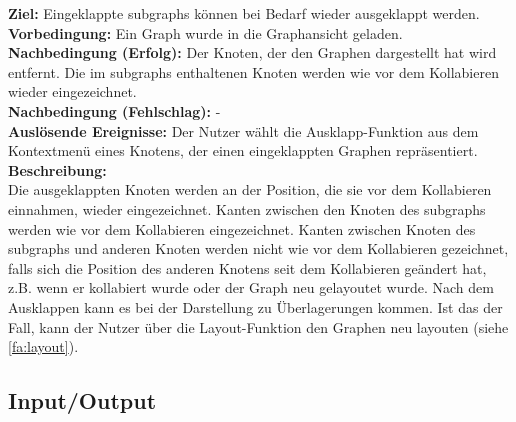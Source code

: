 \label{fa:ausklappen}
\textbf{Ziel:} Eingeklappte \glspl{subgraph} können bei Bedarf wieder ausgeklappt werden.\\
\textbf{Vorbedingung:} Ein Graph wurde in die Graphansicht geladen.\\
\textbf{Nachbedingung (Erfolg):} Der Knoten, der den Graphen dargestellt hat wird entfernt. Die im \glspl{subgraph} enthaltenen Knoten werden wie vor dem Kollabieren wieder eingezeichnet.\\
\textbf{Nachbedingung (Fehlschlag):} -\\
\textbf{Auslösende Ereignisse:} Der Nutzer wählt die Ausklapp-Funktion aus dem Kontextmenü eines Knotens, der einen eingeklappten Graphen repräsentiert.\\ %
\textbf{Beschreibung:}\\
Die ausgeklappten Knoten werden an der Position, die sie vor dem Kollabieren einnahmen,  wieder eingezeichnet.
Kanten zwischen den Knoten des \glspl{subgraph} werden wie vor dem Kollabieren eingezeichnet.
Kanten zwischen Knoten des \glspl{subgraph} und anderen Knoten werden nicht wie vor dem Kollabieren gezeichnet,
falls sich die Position des anderen Knotens seit dem Kollabieren geändert hat, z.B. wenn er kollabiert wurde oder der Graph neu gelayoutet wurde.
Nach dem Ausklappen kann es bei der Darstellung zu Überlagerungen kommen.
Ist das der Fall, kann der Nutzer über die Layout-Funktion den Graphen neu layouten (siehe \ref{fa:layout}).

\subsection{Input/Output}
\setcounter{fanr}{100}

